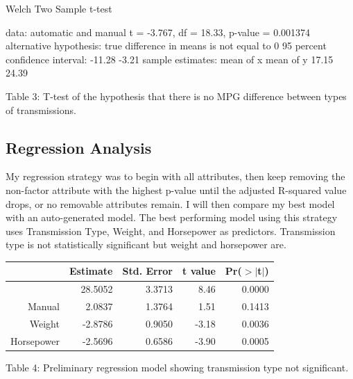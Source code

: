\documentclass{article}
\begin{document}
{\begin{center}
\begin{minipage}{0.65\textwidth} 
\begin{Schunk}
\begin{Soutput}
	Welch Two Sample t-test

data:  automatic and manual
t = -3.767, df = 18.33, p-value = 0.001374
alternative hypothesis: true difference in means is not equal to 0
95 percent confidence interval:
 -11.28  -3.21
sample estimates:
mean of x mean of y 
    17.15     24.39 
\end{Soutput}
\end{Schunk}


Table 3: T-test of the hypothesis that there is no MPG difference between types of transmissions.
\end{minipage}
\end{center}


\subsection{Regression Analysis}
My regression strategy was to begin with all attributes, then keep removing the non-factor attribute with the highest p-value until the adjusted R-squared value drops, or no removable attributes remain. I will then compare my best model with an auto-generated model. The best performing model using this strategy uses Transmission Type, Weight, and Horsepower as predictors. Transmission type is not statistically significant but weight and horsepower are.

\begin{center}
\begin{minipage}{0.5\textwidth} 
\begin{tabular}{rrrrr}
  \hline
 & Estimate & Std. Error & t value & Pr($>$$|$t$|$) \\ 
  \hline
[Intercept] & 28.5052 & 3.3713 & 8.46 & 0.0000 \\ 
  Manual & 2.0837 & 1.3764 & 1.51 & 0.1413 \\ 
  Weight & -2.8786 & 0.9050 & -3.18 & 0.0036 \\ 
  Horsepower & -2.5696 & 0.6586 & -3.90 & 0.0005 \\ 
   \hline
\end{tabular}
Table 4: Preliminary regression model showing transmission type not significant.
\end{minipage} 
\end{center}

}
\end{document}
